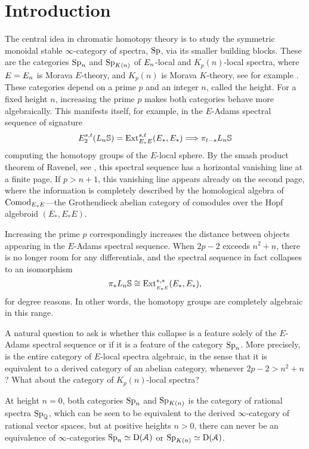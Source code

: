 

\section{Introduction}
\label{ch1:sec:introduction}

The central idea in chromatic homotopy theory is to study the symmetric monoidal stable $\infty$-category of spectra, $\mathrm{Sp}$, via its smaller building blocks. These are the categories $\mathrm{Sp}_{n}$ and $\mathrm{Sp}_{{K(n)}}$ of $E_{n}$-local and $K_p(n)$-local spectra, where $E=E_{n}$ is Morava $E$-theory, and $K_p(n)$ is Morava $K$-theory, see for example \cite{hovey-strickland_99}. These categories depend on a prime $p$ and an integer $n$, called the height. For a fixed height $n$, increasing the prime $p$ makes both categories behave more algebraically. This manifests itself, for example, in the $E$-Adams spectral sequence of signature
\[E^{s,t}_2 (L_n\mathbb{S}) = \operatorname{Ext}_{E_*E}^{s,t}(E_*,E_*)\Longrightarrow \pi_{t-s} L_n\mathbb{S}\]
computing the homotopy groups of the $E$-local sphere. By the smash product theorem of Ravenel, see \cite[7.5.6]{ravenel_92}, this spectral sequence has a horizontal vanishing line at a finite page. If $p>n+1$, this vanishing line appears already on the second page, where the information is completely described by the homological algebra of $\mathrm{Comod}_{E_*E}$---the Grothendieck abelian category of comodules over the Hopf algebroid $(E_*, E_*E)$. 

Increasing the prime $p$ correspondingly increases the distance between objects appearing in the $E$-Adams spectral sequence. When $2p-2$ exceeds $n^2+n$, there is no longer room for any differentials, and the  spectral sequence in fact collapses to an isomorphism
\[\pi_* L_n\mathbb{S}\cong \operatorname{Ext}^{*,*}_{_{E_*E}}(E_*, E_*),\]
for degree reasons. In other words, the homotopy groups are completely algebraic in this range. 

A natural question to ask is whether this collapse is a feature solely of the $E$-Adams spectral sequence or if it is a feature of the category $\mathrm{Sp}_{n}$. More precisely, is the entire category of $E$-local spectra algebraic, in the sense that it is equivalent to a derived category of an abelian category, whenever $2p-2>n^2+n$? What about the category of $K_p(n)$-local spectra?

At height $n=0$, both categories $\mathrm{Sp}_{n}$ and $\mathrm{Sp}_{{K(n)}}$ is the category of rational spectra $\mathrm{Sp}_{\mathbb{Q}}$, which can be seen to be equivalent to the derived $\infty$-category of rational vector spaces, but at positive heights $n>0$, there can never be an equivalence of $\infty$-categories $\mathrm{Sp}_{n} \simeq \mathrm{D}(\EuScript{A})$ or $\mathrm{Sp}_{{K(n)}} \simeq \mathrm{D}(\EuScript{A})$. 

